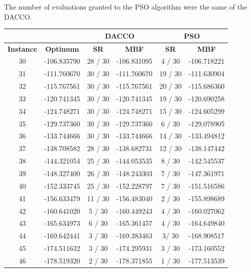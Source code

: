 	The number of evaluations granted to the PSO algorithm were the same of the DACCO. 
	
	\begin{table}[!htdp]
			\begin{center}
				\begin{tabular}{| c | c | c | c | c | c |}
					\hline
					\multicolumn{2}{|c|}{} & \multicolumn{2}{c|}{\textbf{DACCO}} & \multicolumn{2}{c|}{\textbf{PSO}}\\ \hline
					\textbf{Instance} & \textbf{Optimum} & \textbf{SR} & \textbf{MBF} & \textbf{SR} & \textbf{MBF} \\ \hline
					30 & -106.835790 & 28 / 30 & -106.831095 & 4 / 30 & -106.718221 \\ \hline
					31 & -111.760670 & 30 / 30 & -111.760670 & 19 / 30 & -111.630904 \\ \hline
					32 & -115.767561 & 30 / 30 & -115.767561 & 20 / 30 & -115.686360 \\ \hline
					33 & -120.741345 & 30 / 30 & -120.741345 & 19 / 30 & -120.690258 \\ \hline
					34 & -124.748271 & 30 / 30 & -124.748271 & 15 / 30 & -124.605299 \\ \hline
					35 & -129.737360 & 30 / 30 & -129.737360 & 6 / 30 & -129.078905 \\ \hline
					36 & -133.744666 & 30 / 30 & -133.744666 & 14 / 30 & -133.494812 \\ \hline
					37 & -138.708582 & 28 / 30 & -138.682731 & 12 / 30 & -138.147442 \\ \hline
					38 & -144.321054 & 25 / 30 & -144.053535 & 8 / 30 & -142.545537 \\ \hline
					39 & -148.327400 & 26 / 30 & -148.243303 & 7 / 30 & -147.361971 \\ \hline
					40 & -152.333745 & 25 / 30 & -152.228797 & 7 / 30 & -151.516586 \\ \hline
					41 & -156.633479 & 11 / 30 & -156.483040 & 2 / 30 & -155.898689 \\ \hline
					42 & -160.641020 & 5 / 30 & -160.449243 & 4 / 30 & -160.027062 \\ \hline
					43 & -165.634973 & 6 / 30 & -165.361457 & 4 / 30 & -164.649840 \\ \hline
					44 & -169.642441 & 3 / 30 & -169.383463 & 3/ 30 & -168.908517 \\ \hline
					45 & -174.511632 & 3 / 30 & -174.295931 & 3 / 30 & -173.160552 \\ \hline
					46 & -178.519320 & 2 / 30 & -178.371855 & 1 / 30 & -177.513539 \\ \hline

\end{tabular}
\end{center}
\end{table}
